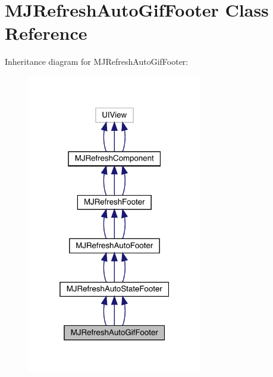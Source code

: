 \hypertarget{interface_m_j_refresh_auto_gif_footer}{}\section{M\+J\+Refresh\+Auto\+Gif\+Footer Class Reference}
\label{interface_m_j_refresh_auto_gif_footer}


Inheritance diagram for M\+J\+Refresh\+Auto\+Gif\+Footer\+:\nopagebreak
\begin{figure}[H]
\begin{center}
\leavevmode
\includegraphics[width=217pt]{interface_m_j_refresh_auto_gif_footer__inherit__graph}
\end{center}
\end{figure}


